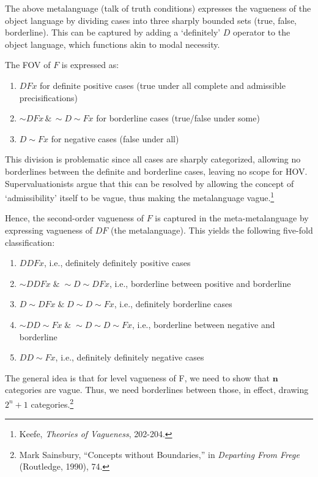The above metalanguage (talk of truth conditions) expresses the
vagueness of the object language by dividing cases into three sharply
bounded sets (true, false, borderline). This can be captured by adding a
`definitely' $D$ operator to the object language, which functions akin to
modal necessity.

The FOV of $F$ is expressed as:

\begin{enumerate}
\def\labelenumi{(\arabic{enumi})}
\item
  $DFx$ for definite positive cases (true under all complete and
  admissible precisifications)
\item
  ${\sim} DFx \, \& \, {\sim} D {\sim} Fx$ for borderline cases (true/false
  under some)
\item
  $D {\sim} Fx$ for negative cases (false under all)
\end{enumerate}

This division is problematic since all cases are sharply categorized,
allowing no borderlines between the definite and borderline cases,
leaving no scope for HOV. Supervaluationists argue that this can be
resolved by allowing the concept of `admissibility' itself to be vague,
thus making the metalanguage vague.\footnote{Keefe, \emph{Theories of
  Vagueness}, 202-204.}

Hence, the second-order vagueness of $F$ is captured in the
meta-metalanguage by expressing vagueness of $DF$ (the metalanguage). This
yields the following five-fold classification:

\begin{enumerate}
\def\labelenumi{(\arabic{enumi})}
\item
  $DDFx$, i.e., definitely definitely positive cases
\item
  ${\sim} DDFx \; \& \; {\sim} D {\sim} DFx$, i.e., borderline between positive
  and borderline
\item
  $D {\sim} DFx \; \& \; D{\sim} D{\sim} Fx$, i.e., definitely borderline cases
\item
  ${\sim}DD{\sim} Fx \; \& \; {\sim}D{\sim}D{\sim}Fx$, i.e., borderline between
  negative and borderline
\item
  $DD{\sim}Fx$, i.e., definitely definitely negative cases
\end{enumerate}

The general idea is that for  level vagueness of F, we need
to show that $\mathbf{n}$ categories are vague. Thus, we need borderlines
between those, in effect, drawing $2^n+1$ categories.\footnote{Mark
  Sainsbury, ``Concepts without Boundaries,'' in \emph{Departing From
  Frege} (Routledge, 1990), 74.}

